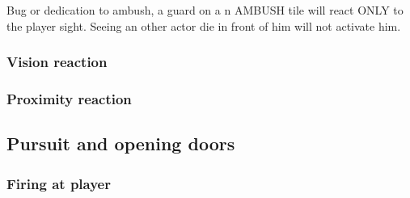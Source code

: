  Bug or dedication to ambush, a guard on a n AMBUSH tile will react ONLY to the player sight. Seeing an other actor die in front of him will not activate him.\\

\subsubsection{Vision reaction}
\subsubsection{Proximity reaction}
\subsection{Pursuit and opening doors}

\subsubsection{Firing at player}






